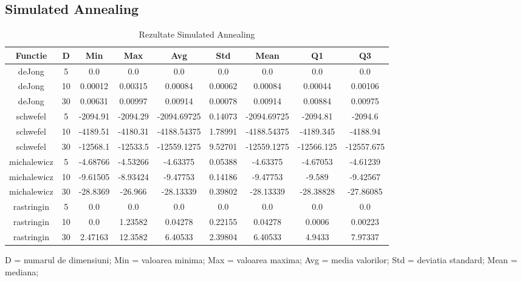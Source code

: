 \documentclass{article}
\begin{document}
\subsection{Simulated Annealing}
\begin{table}[h]
\begin{tabular}{ccccccccc}
\hline
Functie&D&Min&Max&Avg&Std&Mean&Q1&Q3\\
\hline
\hline
deJong&5&0.0&0.0&0.0&0.0&0.0&0.0&0.0 \\ \hline
deJong&10&0.00012&0.00315&0.00084&0.00062&0.00084&0.00044&0.00106 \\ \hline
deJong&30&0.00631&0.00997&0.00914&0.00078&0.00914&0.00884&0.00975 \\ \hline
\hline
schwefel&5&-2094.91&-2094.29&-2094.69725&0.14073&-2094.69725&-2094.81&-2094.6 \\ \hline
schwefel&10&-4189.51&-4180.31&-4188.54375&1.78991&-4188.54375&-4189.345&-4188.94 \\ \hline
schwefel&30&-12568.1&-12533.5&-12559.1275&9.52701&-12559.1275&-12566.125&-12557.675 \\ \hline
\hline
michalewicz&5&-4.68766&-4.53266&-4.63375&0.05388&-4.63375&-4.67053&-4.61239 \\ \hline
michalewicz&10&-9.61505&-8.93424&-9.47753&0.14186&-9.47753&-9.589&-9.42567 \\ \hline
michalewicz&30&-28.8369&-26.966&-28.13339&0.39802&-28.13339&-28.38828&-27.86085 \\ \hline
\hline
rastringin&5&0.0&0.0&0.0&0.0&0.0&0.0&0.0 \\ \hline
rastringin&10&0.0&1.23582&0.04278&0.22155&0.04278&0.0006&0.00223 \\ \hline
rastringin&30&2.47163&12.3582&6.40533&2.39804&6.40533&4.9433&7.97337 \\ \hline
\hline
\end{tabular}
\caption{Rezultate Simulated Annealing} \footnotesize{D = numarul de dimensiuni}; {Min = valoarea minima}; {Max = valoarea maxima}; {Avg = media valorilor}; {Std = deviatia standard}; {Mean = mediana};
\end{table}
\end{document}
